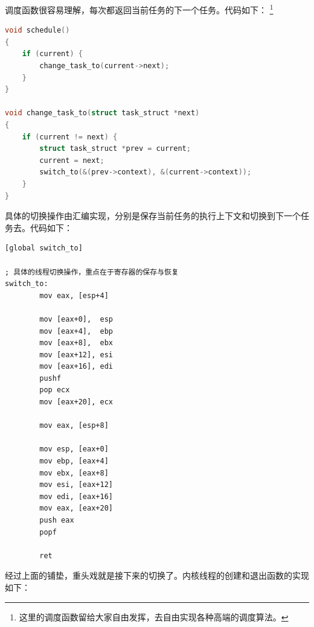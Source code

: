 \par 调度函数很容易理解，每次都返回当前任务的下一个任务。代码如下：
\footnote{这里的调度函数留给大家自由发挥，去自由实现各种高端的调度算法。}

\begin{lstlisting}[language = C, caption = include/sched.h]
void schedule()
{
	if (current) {
		change_task_to(current->next);
	}
}

void change_task_to(struct task_struct *next)
{
	if (current != next) {
		struct task_struct *prev = current;
		current = next;
		switch_to(&(prev->context), &(current->context));
	}
}
\end{lstlisting}

\par 具体的切换操作由汇编实现，分别是保存当前任务的执行上下文和切换到下一个任务去。代码如下：

\begin{lstlisting}[language = {[x86masm]Assembler}, caption = kernel/sched/switch\_to.s]
[global switch_to]

; 具体的线程切换操作，重点在于寄存器的保存与恢复
switch_to:
        mov eax, [esp+4]

        mov [eax+0],  esp
        mov [eax+4],  ebp
        mov [eax+8],  ebx
        mov [eax+12], esi
        mov [eax+16], edi
        pushf
        pop ecx
        mov [eax+20], ecx

        mov eax, [esp+8]

        mov esp, [eax+0]
        mov ebp, [eax+4]
        mov ebx, [eax+8]
        mov esi, [eax+12]
        mov edi, [eax+16]
        mov eax, [eax+20]
        push eax
        popf
 	
        ret
\end{lstlisting}

\par 经过上面的铺垫，重头戏就是接下来的切换了。内核线程的创建和退出函数的实现如下：

